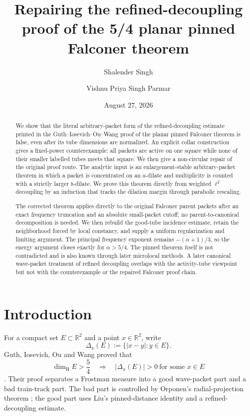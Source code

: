 \documentclass[11pt,letterpaper]{amsart}
\title[Repairing the planar pinned Falconer proof]{Repairing the refined-decoupling proof of the 5/4 planar pinned Falconer theorem}
\author{Shalender Singh}
\author{Vishnu Priya Singh Parmar}
\date{August 27, 2026}
\newcommand{\R}{\mathbb{R}}
\newcommand{\abs}[1]{\lvert#1\rvert}
\begin{document}
\begin{abstract}
We show that the literal arbitrary-packet form of the refined-decoupling
estimate printed in the Guth--Iosevich--Ou--Wang proof of the planar pinned
Falconer theorem is false, even after its tube dimensions are normalized.
An explicit collar construction gives a fixed-power counterexample: all
packets are active on one square while none of their smaller labelled tubes
meets that square.  We then give a non-circular repair of the original proof
route.  The analytic input is an enlargement-stable arbitrary-packet theorem
in which a packet is concentrated on an \(a\)-dilate and multiplicity is
counted with a strictly larger \(b\)-dilate.  We prove this theorem directly
from weighted \(\ell^2\) decoupling by an induction that tracks the dilation
margin through parabolic rescaling.

The corrected theorem applies directly to the original Falconer parent
packets after an exact frequency truncation and an absolute small-packet
cutoff; no parent-to-canonical decomposition is needed.  We then rebuild the
good-tube incidence estimate, retain the neighborhood forced by local
constancy, and supply a uniform regularization and limiting argument.  The
principal frequency exponent remains \(-(\alpha+1)/3\), so the energy
argument closes exactly for \(\alpha>5/4\).  The pinned theorem itself is not
contradicted and is also known through later microlocal methods.  A later
canonical wave-packet treatment of refined decoupling overlaps with the
activity-tube viewpoint but not with the counterexample or the repaired
Falconer proof chain.
\end{abstract}

\maketitle

\section{Introduction}

For a compact set \(E\subset\R^2\) and a point \(x\in\R^2\), write
\[
  \Delta_x(E):=\{\abs{x-y}:y\in E\}.
\]
Guth, Iosevich, Ou and Wang proved that
\[
 \dim_{\mathrm H}E>\frac54
 \quad\Longrightarrow\quad
 \abs{\Delta_x(E)}>0\ \text{for some }x\in E
\]
\cite{GIOW}.  Their proof separates a Frostman measure into a good
wave-packet part and a bad train-track part.  The bad part is controlled by
Orponen's radial-projection theorem \cite{Orponen}; the good part uses Liu's
pinned-distance identity \cite{Liu} and a refined-decoupling estimate.
\end{document}
